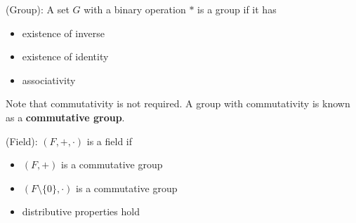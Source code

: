 \begin{definition}
(Group):  A set $G$ with a binary operation $*$ is a group if it has
\begin{itemize}
\item existence of inverse
\item existence of identity
\item associativity
\end{itemize}
\end{definition}

\begin{remark}
Note that commutativity is not required. A group with commutativity is known as a \textbf{commutative group}.
\end{remark}

\begin{definition}
(Field): $(F, +, \cdot)$ is a field if
\begin{itemize}
    \item $(F, +)$ is a commutative group
    \item $(F \setminus \{ 0 \}, \cdot )$ is a commutative group
    \item distributive properties hold
\end{itemize} 
\end{definition}

\newpage








